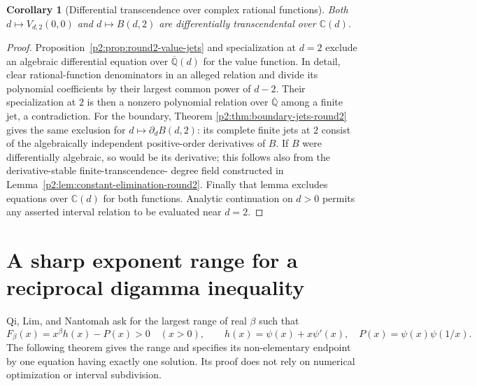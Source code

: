 \documentclass[11pt,a4paper]{article}
\newtheorem{corollary}[theorem]{Corollary}
\theoremstyle{definition}
\theoremstyle{remark}
\numberwithin{equation}{section}
\begin{document}
\begin{corollary}[Differential transcendence over complex rational functions]
Both $d\mapsto V_{d,2}(0,0)$ and $d\mapsto B(d,2)$ are
differentially transcendental over $\mathbb C(d)$.
\end{corollary}
\begin{proof}
Proposition~\ref{p2:prop:round2-value-jets} and specialization at $d=2$
exclude an algebraic differential equation over
$\overline{\mathbb Q}(d)$ for the value function. In detail, clear
rational-function denominators in an alleged relation and divide its
polynomial coefficients by their largest common power of $d-2$.
Their specialization at $2$ is then a nonzero polynomial relation
over $\overline{\mathbb Q}$ among a finite jet, a contradiction.
For the boundary, Theorem
\ref{p2:thm:boundary-jets-round2} gives the same exclusion for
$d\mapsto\partial_dB(d,2)$: its complete finite jets at $2$ consist
of the algebraically independent positive-order derivatives of $B$.
If $B$ were differentially algebraic, so would be its derivative;
this follows also from the derivative-stable finite-transcendence-
degree field constructed in Lemma~\ref{p2:lem:constant-elimination-round2}.
Finally that lemma excludes equations over $\mathbb C(d)$ for both
functions. Analytic continuation on $d>0$ permits any asserted
interval relation to be evaluated near $d=2$.
\end{proof}



\section{A sharp exponent range for a reciprocal digamma inequality}
\label{p2:sec:qln-op3}

Qi, Lim, and Nantomah \cite[Open Problem~3]{p2:qln2025} ask for the largest
range of real $\beta$ such that
\[
 F_\beta(x)=x^\beta h(x)-P(x)>0\quad(x>0),\qquad
 h(x)=\psi(x)+x\psi'(x),\quad P(x)=\psi(x)\psi(1/x).
\]
The following theorem gives the range and specifies its non-elementary
endpoint by one equation having exactly one solution.  Its proof does not
rely on numerical optimization or interval subdivision.
\end{document}
